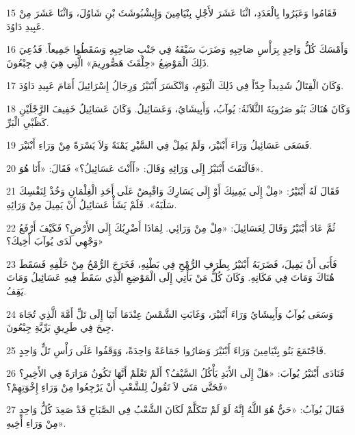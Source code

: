 \par 15 فَقَامُوا وَعَبَرُوا بِالْعَدَدِ، اثْنَا عَشَرَ لأَجْلِ بِنْيَامِينَ وَإِيشْبُوشَثَ بْنِ شَاوُلَ، وَاثْنَا عَشَرَ مِنْ عَبِيدِ دَاوُدَ.
\par 16 وَأَمْسَكَ كُلُّ وَاحِدٍ بِرَأْسِ صَاحِبِهِ وَضَرَبَ سَيْفَهُ فِي جَنْبِ صَاحِبِهِ وَسَقَطُوا جَمِيعاً. فَدُعِيَ ذَلِكَ الْمَوْضِعُ «حِلْقَثَ هَصُّورِيمَ» الَّتِي هِيَ فِي جِبْعُونَ.
\par 17 وَكَانَ الْقِتَالُ شَدِيداً جِدّاً فِي ذَلِكَ الْيَوْمِ، وَانْكَسَرَ أَبْنَيْرُ وَرِجَالُ إِسْرَائِيلَ أَمَامَ عَبِيدِ دَاوُدَ.
\par 18 وَكَانَ هُنَاكَ بَنُو صَرُويَةَ الثَّلاَثَةُ: يُوآبُ، وَأَبِيشَايُ، وَعَسَائِيلُ. وَكَانَ عَسَائِيلُ خَفِيفَ الرَِّجْلَيْنِ كَظَبْيِ الْبَرِّ.
\par 19 فَسَعَى عَسَائِيلُ وَرَاءَ أَبْنَيْرَ، وَلَمْ يَمِلْ فِي السَّيْرِ يَمْنَةً وَلاَ يَسْرَةً مِنْ وَرَاءِ أَبْنَيْرَ.
\par 20 فَالْتَفَتَ أَبْنَيْرُ إِلَى وَرَائِهِ وَقَالَ: «أَأَنْتَ عَسَائِيلُ؟» فَقَالَ: «أَنَا هُوَ».
\par 21 فَقَالَ لَهُ أَبْنَيْرُ: «مِلْ إِلَى يَمِينِكَ أَوْ إِلَى يَسَارِكَ وَاقْبِضْ عَلَى أَحَدِ الْغِلْمَانِ وَخُذْ لِنَفْسِكَ سَلَبَهُ». فَلَمْ يَشَأْ عَسَائِيلُ أَنْ يَمِيلَ مِنْ وَرَائِهِ.
\par 22 ثُمَّ عَادَ أَبْنَيْرُ وَقَالَ لِعَسَائِيلَ: «مِلْ مِنْ وَرَائِي. لِمَاذَا أَضْرِبُكَ إِلَى الأَرْضِ؟ فَكَيْفَ أَرْفَعُ وَجْهِي لَدَى يُوآبَ أَخِيكَ؟»
\par 23 فَأَبَى أَنْ يَمِيلَ، فَضَرَبَهُ أَبْنَيْرُ بِطَرَفِ الرُّمْحِ فِي بَطْنِهِ، فَخَرَجَ الرُّمْحُ مِنْ خَلْفِهِ فَسَقَطَ هُنَاكَ وَمَاتَ فِي مَكَانِهِ. وَكَانَ كُلُّ مَنْ يَأْتِي إِلَى الْمَوْضِعِ الَّذِي سَقَطَ فِيهِ عَسَائِيلُ وَمَاتَ يَقِفُ.
\par 24 وَسَعَى يُوآبُ وَأَبِيشَايُ وَرَاءَ أَبْنَيْرَ، وَغَابَتِ الشَّمْسُ عِنْدَمَا أَتَيَا إِلَى تَلِّ أَمَّةَ الَّذِي تُجَاهَ جِيحَ فِي طَرِيقِ بَرِّيَّةِ جِبْعُونَ.
\par 25 فَاجْتَمَعَ بَنُو بِنْيَامِينَ وَرَاءَ أَبْنَيْرَ وَصَارُوا جَمَاعَةً وَاحِدَةً، وَوَقَفُوا عَلَى رَأْسِ تَلٍّ وَاحِدٍ.
\par 26 فَنَادَى أَبْنَيْرُ يُوآبَ: «هَلْ إِلَى الأَبَدِ يَأْكُلُ السَّيْفُ؟ أَلَمْ تَعْلَمْ أَنَّهَا تَكُونُ مَرَارَةً فِي الأَخِيرِ؟ فَحَتَّى مَتَى لاَ تَقُولُ لِلشَّعْبِ أَنْ يَرْجِعُوا مِنْ وَرَاءِ إِخْوَتِهِمْ؟»
\par 27 فَقَالَ يُوآبُ: «حَيٌّ هُوَ اللَّهُ إِنَّهُ لَوْ لَمْ تَتَكَلَّمْ لَكَانَ الشَّعْبُ فِي الصَّبَاحِ قَدْ صَعِدَ كُلُّ وَاحِدٍ مِنْ وَرَاءِ أَخِيهِ».
